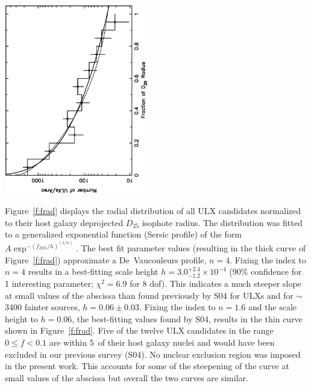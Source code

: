 \documentclass{article}
\begin{document}
\begin{center}
\includegraphics[angle=-90,width=0.47\textwidth]{f04.eps} %
\end{center}

Figure~\ref{f:frad} displays the radial distribution of all ULX candidates normalized to their host galaxy
deprojected $D_{25}$ isophote radius.
%
The distribution was fitted to a generalized exponential function (Sersic profile) of the form
$A\exp^{-(f_{D25}/h)^{(1/n)}}$. 
The best fit parameter values (resulting in the thick curve of Figure~\ref{f:frad}) 
 approximate a De~Vaucouleurs profile, $n=4$.
Fixing the index to $n=4$ results in a best-fitting scale height $h=3.0_{-1.2}^{+2.4}\times 10^{-4}$ 
(90\% confidence for 1 interesting parameter; $\chi^2=6.9$ for 8 dof).
This indicates a much steeper slope at small values of the abscissa than found previously by S04
 for ULXs and for $\sim$3400 fainter sources, $h=0.06\pm0.03$.
Fixing the index to $n=1.6$ and the scale height to $h=0.06$, the best-fitting values found by S04,
 results in the thin curve shown in Figure~\ref{f:frad}.
Five of the twelve ULX candidates in the range $0\le f < 0.1$ are within 5\arcsec\ of their host
 galaxy nuclei and would have been excluded in our previous survey (S04).
No nuclear exclusion region was imposed in the present work.
This accounts for some of the steepening of the curve 
 at small values of the abscissa but overall the two curves are similar.
\end{document}
